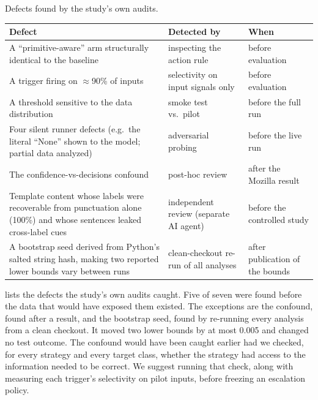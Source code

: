 \begin{widetable}
\centering
\caption{Defects found by the study's own audits.}
\label{tab:audits}

\small
\begin{tabularx}{\linewidth}{Y l l}
\toprule
Defect & Detected by & When \\
\midrule
A ``primitive-aware'' arm structurally identical to the baseline & inspecting the action rule & before evaluation \\ \addlinespace
A trigger firing on $\approx$90\% of inputs & selectivity on input signals only & before evaluation \\ \addlinespace
A threshold sensitive to the data distribution & smoke test vs.\ pilot & before the full run \\ \addlinespace
Four silent runner defects (e.g.\ the literal ``None'' shown to the model; partial data analyzed) & adversarial probing & before the live run \\ \addlinespace
The confidence-vs-decisions confound & post-hoc review & after the Mozilla result \\ \addlinespace
Template content whose labels were recoverable from punctuation alone (100\%) and whose sentences leaked cross-label cues & independent review (separate AI agent) & before the controlled study \\ \addlinespace
A bootstrap seed derived from Python's salted string hash, making two reported lower bounds vary between runs & clean-checkout re-run of all analyses & after publication of the bounds \\
\bottomrule
\end{tabularx}

\end{widetable}

 lists the defects the study's own audits caught. Five of
seven were found before the data that would have exposed them existed.
The exceptions are the confound, found after a result, and the bootstrap
seed, found by re-running every analysis from a clean checkout. It moved
two lower bounds by at most 0.005 and changed no test outcome. The
confound would have been caught earlier had we checked, for every
strategy and every target class, whether the strategy had access to the
information needed to be correct. We suggest running that check, along with measuring
each trigger's selectivity on pilot inputs, before freezing an escalation
policy.

